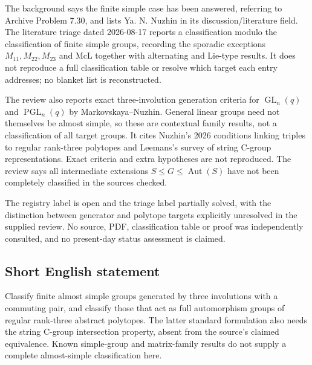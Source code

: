 \documentclass[11pt]{article}
\begin{document}
The background says the finite simple case has been answered, referring to Archive Problem 7.30, and lists Ya. N. Nuzhin in its discussion/literature field. The literature triage dated 2026-08-17 reports a classification modulo the classification of finite simple groups, recording the sporadic exceptions $M_{11},M_{22},M_{23}$ and $\mathrm{McL}$ together with alternating and Lie-type results. It does not reproduce a full classification table or resolve which target each entry addresses; no blanket list is reconstructed.

The review also reports exact three-involution generation criteria for $\operatorname{GL}_n(q)$ and $\operatorname{PGL}_n(q)$ by Markovskaya--Nuzhin. General linear groups need not themselves be almost simple, so these are contextual family results, not a classification of all target groups. It cites Nuzhin's 2026 conditions linking triples to regular rank-three polytopes and Leemans's survey of string C-group representations. Exact criteria and extra hypotheses are not reproduced. The review says all intermediate extensions $S\leq G\leq\operatorname{Aut}(S)$ have not been completely classified in the sources checked.

The registry label is open and the triage label partially solved, with the distinction between generator and polytope targets explicitly unresolved in the supplied review. No source, PDF, classification table or proof was independently consulted, and no present-day status assessment is claimed.
\subsection{Short English statement}
Classify finite almost simple groups generated by three involutions with a commuting pair, and classify those that act as full automorphism groups of regular rank-three abstract polytopes. The latter standard formulation also needs the string C-group intersection property, absent from the source's claimed equivalence. Known simple-group and matrix-family results do not supply a complete almost-simple classification here.
\end{document}
